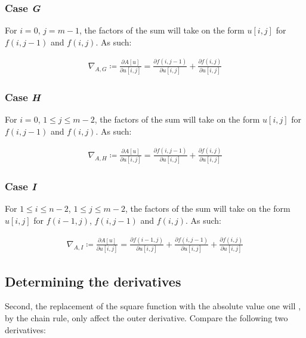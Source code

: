 \documentclass[a4paper]{scrreprt}
\begin{document}
\subsubsection{Case \emph{G}}

For $i = 0$, $j = m -1$, the factors of the sum will take on the form $u[i, j]$
for $f(i, j - 1)$ and $f(i, j)$. As such:

\begin{align*}
		\nabla_{A, G} \coloneqq \frac{\partial A[u]}{\partial u[i, j]} = 
		  \frac{\partial f(i, j - 1)}{\partial u[i, j]}
		  + \frac{\partial f(i, j)}{\partial u[i, j]}
\end{align*}

\subsubsection{Case \emph{H}}

For $i = 0$, $1 \leq j \leq m - 2$, the factors of the sum will take on the
form $u[i, j]$ for $f(i, j - 1)$ and $f(i, j)$. As such:

\begin{align*}
		\nabla_{A, H} \coloneqq \frac{\partial A[u]}{\partial u[i, j]} = 
		  \frac{\partial f(i, j - 1)}{\partial u[i, j]}
		  + \frac{\partial f(i, j)}{\partial u[i, j]}
\end{align*}

\subsubsection{Case \emph{I}}

For $1 \leq i \leq n - 2$, $1 \leq j \leq m - 2$, the factors of the sum will
take on the form $u[i, j]$ for $f(i - 1, j)$, $f(i, j - 1)$ and $f(i, j)$. As
such:

\begin{align*}
		\nabla_{A, I} \coloneqq \frac{\partial A[u]}{\partial u[i, j]} = 
		  \frac{\partial f(i - 1, j)}{\partial u[i, j]}
		  + \frac{\partial f(i, j - 1)}{\partial u[i, j]}
		  + \frac{\partial f(i, j)}{\partial u[i, j]}
\end{align*}

\subsection{Determining the derivatives}

Second, the replacement of the square function with the absolute value one will
, by the chain rule, only affect the outer derivative. Compare the following
two derivatives:
\end{document}
